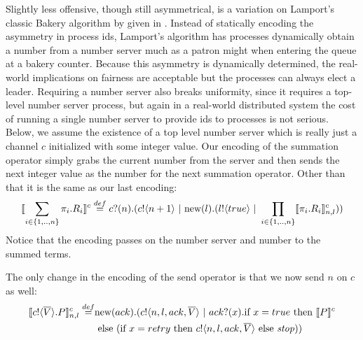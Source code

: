 Slightly less offensive, though still asymmetrical, is a variation on Lamport's classic Bakery algorithm  by given in \cite{nest00}.
Instead of statically encoding the asymmetry in process ids, Lamport's algorithm has processes dynamically obtain a number from a number server much as a patron might when entering the queue at a bakery counter.
Because this asymmetry is dynamically determined, the real-world implications on fairness are acceptable but the processes can always elect a leader.
Requiring a number server also breaks uniformity, since it requires a top-level number server process, but again in a real-world distributed system the cost of running a single number server to provide ids to processes is not serious.  Below, we assume the existence of a top level number server which is really just a channel $c$ initialized with some integer value.  Our encoding of the summation operator simply grabs the current number from the server and then sends the next integer value as the number for the next summation operator.  Other than that it is the same as our last encoding:
\[
	\llbracket{\displaystyle\sum_{i\in \{1,..,n\}} \pi_i.R_i}\rrbracket^c \overset{\tiny{def}}{=} {c}?({n}).({c}!\langle{n+1}\rangle \ |\  \text{new}({l}).({l}!\langle{true}\rangle \ |\  \displaystyle\prod_{i\in \{1,..,n\}}\llbracket{\pi_i.R_i}\rrbracket^c_{n,l}))
\]
Notice that the encoding passes on the number server and number to the summed terms.

The only change in the encoding of the send operator is that we now send $n$ on $c$ as well:
\begin{equation*}\begin{split}
	\llbracket{ \ensuremath{{c}!\langle{ \ensuremath{\overline{V}} }\rangle.} P}\rrbracket^c_{n,l} \overset{\tiny{def}}{=} & \text{new}({ack}).({c}!\langle{n,l,ack, \ensuremath{\overline{V}} }\rangle \ |\  {ack}?({x}). \text{if } {x=true} \text{ then } \llbracket{P}\rrbracket^c \\
	&\text{ else } (\text{if } {x=retry} \text{ then } {c}!\langle{n,l,ack, \ensuremath{\overline{V}} }\rangle \text{ else } \mbox{\emph{stop}}))
\end{split}\end{equation*}

